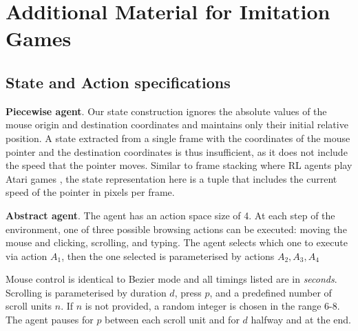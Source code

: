 
\chapter{Additional Material for Imitation Games}\label{apx:recaptcha}

\section{State and Action specifications}
\label{appendix:b}

\textbf{Piecewise agent}. Our state construction ignores the absolute values of the mouse origin and destination coordinates and maintains only their initial relative position.
A state extracted from a single frame with the coordinates of the mouse pointer and the destination coordinates is thus insufficient, as it does not include the speed that the pointer moves.
Similar to frame stacking where \gls{RL} agents play Atari games \cite{Mnih2013}, the state representation here is a tuple that includes the current speed of the pointer in pixels per frame.


\textbf{Abstract agent}. The agent has an action space size of 4.
At each step of the environment, one of three possible browsing actions can be executed: moving the mouse and clicking, scrolling, and typing.
The agent selects which one to execute via action $A_1$, then the one selected is parameterised by actions $A_2,A_3,A_4$

Mouse control is identical to Bezier mode and all timings listed are in \textit{seconds}.
Scrolling is parameterised by duration $d$, press $p$, and a predefined number of scroll units $n$.
If $n$ is not provided, a random integer is chosen in the range 6-8.
The agent pauses for $p$ between each scroll unit and for $d$ halfway and at the end.

